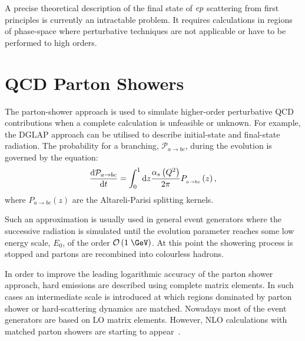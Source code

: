 A precise theoretical description of the final state of $\mbox{$e p$}$ scattering from first principles is currently an intractable problem. It requires calculations in regions of phase-space where perturbative techniques are not applicable or have to be performed to high orders.
\section{QCD Parton Showers}
\label{sec:qcdpartonshower}
The parton-shower approach is used to simulate higher-order perturbative QCD contributions when a complete calculation is unfeasible or unknown. For example, the DGLAP approach can be utilised to describe initial-state and final-state radiation. The probability for a branching, $\mathcal{P}_{a\rightarrow bc}$, during the evolution is governed by the equation:
\begin{equation}
\frac{\mathrm{d}\mathcal{P}_{a\rightarrow bc}}{\mathrm{d}t} = \int_0^1{\mathrm{d}z\frac{\mbox{$\alpha_{s}$}\left(\mbox{${Q^2}$}\right)}{2\pi}P_{_{a\rightarrow bc}}}\left(z\right),
\end{equation}
where $P_{a\rightarrow bc}\left(z\right)$ are the Altareli-Parisi splitting kernels.

Such an approximation is usually used in general event generators where the successive radiation is simulated until the evolution parameter reaches some low energy scale, $E_0$, of the order $\mathcal{O}\left(1\;\GeV\right)$. At this point the showering process is stopped and partons are recombined into colourless hadrons.

In order to improve the leading logarithmic accuracy of the parton shower approach, hard emissions are described using complete matrix elements. In such cases an intermediate scale is introduced at which regions dominated by parton shower or hard-scattering dynamics are matched. Nowadays most of the event generators are based on LO matrix elements. However, NLO calculations with matched parton showers are starting to appear~\cite{powheg, mcatnlo}.

